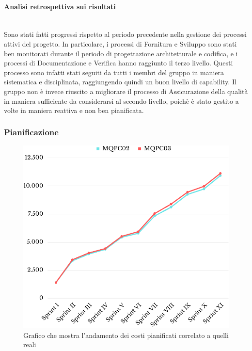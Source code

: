 \paragraph{Analisi retrospettiva sui risultati}\mbox{}\\
Sono stati fatti progressi rispetto al periodo precedente nella gestione dei processi attivi del progetto. In particolare, i processi di Fornitura e Sviluppo sono stati ben monitorati durante il periodo di progettazione architetturale e codifica, e i processi di Documentazione e Verifica hanno raggiunto il terzo livello. Questi processo sono infatti stati seguiti da tutti i membri del gruppo in maniera sistematica e disciplinata, raggiungendo quindi un buon livello di capability.
Il gruppo non è invece riuscito a migliorare il processo di Assicurazione della qualità in maniera sufficiente da considerarsi al secondo livello, poichè è stato gestito a volte in maniera reattiva e non ben pianificata.

\subsubsection{Pianificazione}
\begin{figure}[H]
	\centering
	\includegraphics[scale=0.5]{img/BCWS-ACWS2.png}
	\caption{Grafico che mostra l'andamento dei costi pianificati correlato a quelli reali}
\end{figure}
